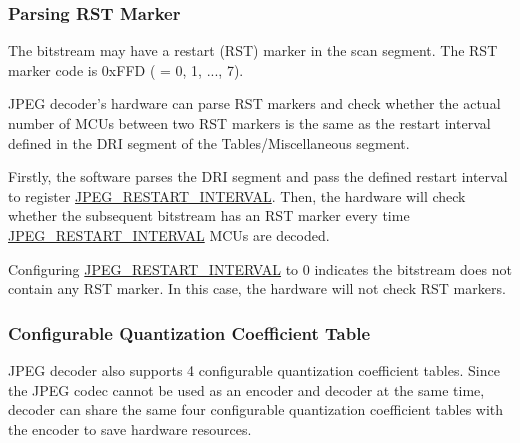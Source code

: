 \documentclass[main\_\_EN.tex]{subfiles}
\begin{document}
\subsubsection{Parsing RST Marker}
\label{sec:jpegcodec-dec-rst_marker}

The bitstream may have a restart (RST) marker in the scan segment. The RST marker code is 0xFFD ( = 0, 1, ..., 7).

JPEG decoder's hardware can parse RST markers and check whether the actual number of MCUs between two RST markers is the same as the restart interval defined in the DRI segment of the Tables/Miscellaneous segment.

Firstly, the software parses the DRI segment and pass the defined restart interval to register \hyperref[fielddesc:JPEGRESTARTINTERVAL]{JPEG\_RESTART\_INTERVAL}. Then, the hardware will check whether the subsequent bitstream has an RST marker every time \hyperref[fielddesc:JPEGRESTARTINTERVAL]{JPEG\_RESTART\_INTERVAL} MCUs are decoded.

Configuring \hyperref[fielddesc:JPEGRESTARTINTERVAL]{JPEG\_RESTART\_INTERVAL} to 0 indicates the bitstream does not contain any RST marker. In this case, the hardware will not check RST markers.

\subsubsection{Configurable Quantization Coefficient Table}
\label{sec:jpegcodec-dec-qnr}

\chipname{} JPEG decoder also supports 4 configurable quantization coefficient tables. Since the JPEG codec cannot be used as an encoder and decoder at the same time, decoder can share the same four configurable quantization coefficient tables with the encoder to save hardware resources.
\end{document}
